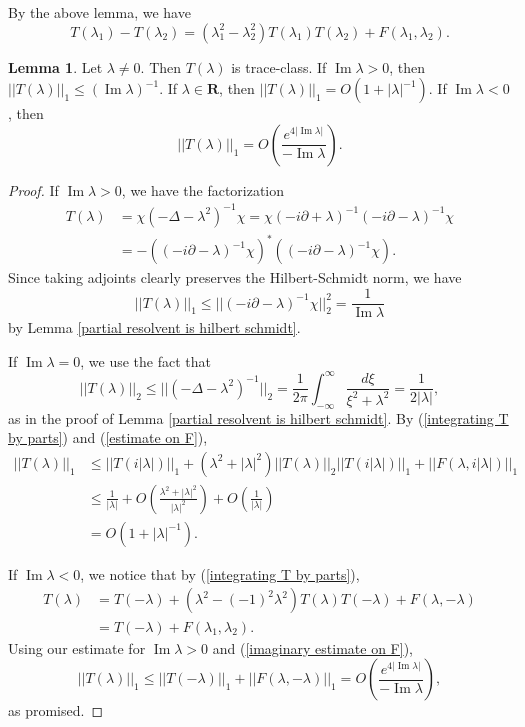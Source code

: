 \documentclass[12pt]{report}
\newcommand{\RR}{\mathbf{R}}
\renewcommand{\Im}{\operatorname{Im}}
\theoremstyle{definition}
\newtheorem{lemma}[theorem]{Lemma}
\begin{document}
By the above lemma, we have
\begin{equation}
\label{integrating T by parts}
  T(\lambda_1) - T(\lambda_2) = (\lambda_1^2 - \lambda_2^2)T(\lambda_1)T(\lambda_2) + F(\lambda_1, \lambda_2).
\end{equation}
\begin{lemma}
\label{T1 is b1}
Let $\lambda \neq 0$. Then $T(\lambda)$ is trace-class. If $\Im \lambda > 0$, then $||T(\lambda)||_1 \leq (\Im \lambda)^{-1}$. If $\lambda \in \RR$, then $||T(\lambda)||_1 = O(1 + |\lambda|^{-1})$. If $\Im \lambda < 0$, then
$$||T(\lambda)||_1 = O\left(\frac{e^{4|\Im \lambda|}}{-\Im \lambda}\right).$$
\end{lemma}
\begin{proof}
If $\Im \lambda > 0$, we have the factorization
\begin{align*}T(\lambda) &= \chi(-\Delta - \lambda^2)^{-1}\chi = \chi(-i\partial + \lambda)^{-1} (-i\partial - \lambda)^{-1} \chi\\ &= -((-i\partial - \lambda)^{-1} \chi)^*((-i\partial - \lambda)^{-1} \chi).\end{align*}
Since taking adjoints clearly preserves the Hilbert-Schmidt norm, we have
$$||T(\lambda)||_1 \leq ||(-i\partial - \lambda)^{-1}\chi||_2^2 = \frac{1}{\Im \lambda}$$
by Lemma \ref{partial resolvent is hilbert schmidt}.

If $\Im \lambda = 0$, we use the fact that
$$||T(\lambda)||_2 \leq ||(-\Delta - \lambda^2)^{-1}||_2 = \frac{1}{2\pi}\int_{-\infty}^\infty \frac{d\xi}{\xi^2 + \lambda^2} = \frac{1}{2|\lambda|},$$
as in the proof of Lemma \ref{partial resolvent is hilbert schmidt}. By (\ref{integrating T by parts}) and (\ref{estimate on F}),
\begin{align*}
||T(\lambda)||_1 &\leq ||T(i|\lambda|)||_1 + (\lambda^2 + |\lambda|^2)||T(\lambda)||_2||T(i|\lambda|)||_1 + ||F(\lambda, i|\lambda|)||_1\\
  &\leq \frac{1}{|\lambda|} + O\left(\frac{\lambda^2 + |\lambda|^2}{|\lambda|^2}\right) + O\left(\frac{1}{|\lambda|}\right)\\
  &= O(1 + |\lambda|^{-1}).
\end{align*}

If $\Im \lambda < 0$, we notice that by (\ref{integrating T by parts}),
\begin{align*}
  T(\lambda) &= T(-\lambda) + (\lambda^2 - (-1)^2\lambda^2)T(\lambda)T(-\lambda) + F(\lambda, -\lambda)\\
  &= T(-\lambda) + F(\lambda_1, \lambda_2).
\end{align*}
Using our estimate for $\Im \lambda > 0$ and (\ref{imaginary estimate on F}),
$$||T(\lambda)||_1 \leq ||T(-\lambda)||_1 + ||F(\lambda, -\lambda)||_1 = O\left(\frac{e^{4|\Im \lambda|}}{-\Im \lambda}\right),$$
as promised.
\end{proof}
\end{document}
